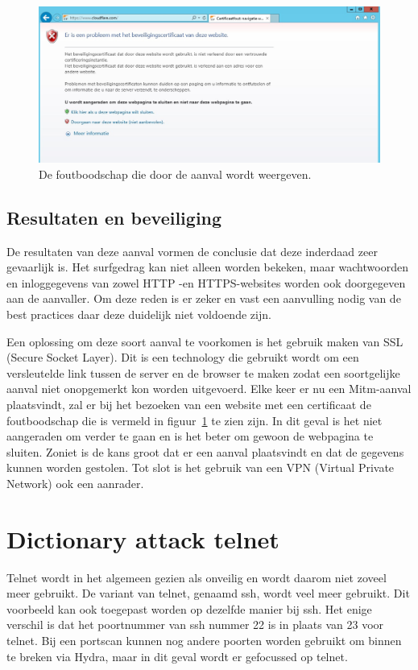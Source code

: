 \documentclass[pdftex,a4paper,12pt]{report}
\begin{document}
\begin{figure}[H]
\begin{center}
\includegraphics[scale=0.50]{img/EttercapCertificaat}
\end{center}
\caption{De foutboodschap die door de aanval wordt weergeven.}
\label{img:EttercapCertificaat}
\end{figure}

\subsection{Resultaten en beveiliging}
De resultaten van deze aanval vormen de conclusie dat deze inderdaad zeer gevaarlijk is. Het surfgedrag kan niet alleen worden bekeken, maar wachtwoorden en inloggegevens van zowel HTTP -en HTTPS-websites worden ook doorgegeven aan de aanvaller. Om deze reden is er zeker en vast een aanvulling nodig van de best practices daar deze duidelijk niet voldoende zijn. \newline

Een oplossing om deze soort aanval te voorkomen is het gebruik maken van SSL (Secure Socket Layer). Dit is een technology die gebruikt wordt om een versleutelde link tussen de server en de browser te maken zodat een soortgelijke aanval niet onopgemerkt kon worden uitgevoerd. Elke keer er nu een Mitm-aanval plaatsvindt, zal er bij het bezoeken van een website met een certificaat de foutboodschap die is vermeld in figuur~\ref{img:EttercapCertificaat} te zien zijn. In dit geval is het niet aangeraden om verder te gaan en is het beter om gewoon de webpagina te sluiten. Zoniet is de kans groot dat er een aanval plaatsvindt en dat de gegevens kunnen worden gestolen. Tot slot is het gebruik van een VPN (Virtual Private Network) ook een aanrader.

\section{Dictionary attack telnet}
Telnet wordt in het algemeen gezien als onveilig en wordt daarom niet zoveel meer gebruikt. De variant van telnet, genaamd ssh, wordt veel meer gebruikt. Dit voorbeeld kan ook toegepast worden op dezelfde manier bij ssh. Het enige verschil is dat het poortnummer van ssh nummer 22 is in plaats van 23 voor telnet. Bij een portscan kunnen nog andere poorten worden gebruikt om binnen te breken via Hydra, maar in dit geval wordt er gefocussed op telnet.
\end{document}
